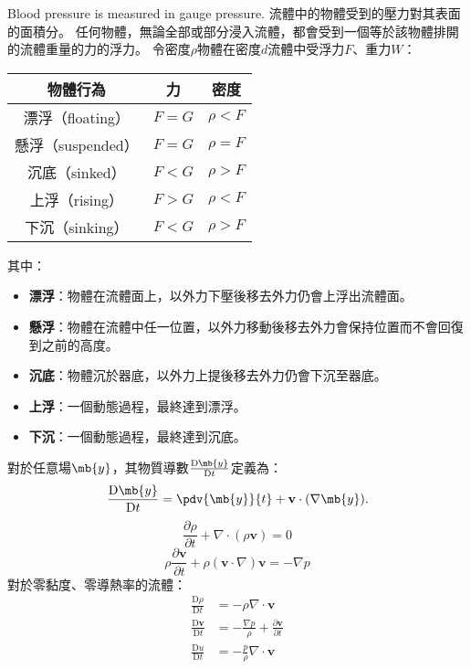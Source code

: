 \documentclass[a4paper,12pt]{article}
\begin{document}
Blood pressure is measured in gauge pressure.
流體中的物體受到的壓力對其表面的面積分。
任何物體，無論全部或部分浸入流體，都會受到一個等於該物體排開的流體重量的力的浮力。
令密度$\rho$物體在密度$d$流體中受浮力$F$、重力$W$：
\begin{longtable}[c]{|c|c|c|}
\hline
物體行為 & 力 & 密度 \\\hline\endhead
漂浮（floating） & $F=G$ & $\rho<F$ \\\hline
懸浮（suspended） & $F=G$ & $\rho=F$ \\\hline
沉底（sinked） & $F<G$ & $\rho>F$ \\\hline
上浮（rising） & $F>G$ & $\rho<F$ \\\hline
下沉（sinking） & $F<G$ & $\rho>F$ \\\hline
\end{longtable}\FB
其中：
\begin{itemize}
\item\textbf{漂浮}：物體在流體面上，以外力下壓後移去外力仍會上浮出流體面。
\item\textbf{懸浮}：物體在流體中任一位置，以外力移動後移去外力會保持位置而不會回復到之前的高度。
\item\textbf{沉底}：物體沉於器底，以外力上提後移去外力仍會下沉至器底。
\item\textbf{上浮}：一個動態過程，最終達到漂浮。
\item\textbf{下沉}：一個動態過程，最終達到沉底。
\end{itemize}
對於任意場$\mb{y}$，其物質導數$\frac{\mathrm{D}\mb{y}}{\mathrm{D}t}$定義為：
\[\frac{\mathrm{D}\mb{y}}{\mathrm{D}t}=\pdv{\mb{y}}{t}+\mathbf{v}\cdot(\nabla \mb{y}).\]
\[\frac{\partial\rho}{\partial t}+\nabla\cdot(\rho\mathbf{v})=0\]
\[\rho\frac{\partial\mathbf{v}}{\partial t}+\rho(\mathbf{v}\cdot\nabla)\mathbf{v}=-\nabla p\]
對於零黏度、零導熱率的流體：
\[\begin{aligned}
\frac{\mathrm{D}\rho}{\mathrm{D}t}&=-\rho\nabla\cdot\mathbf {v}\\
\frac{\mathrm{D}\mathbf{v}}{\mathrm{D}t}&=-\frac{\nabla p}{\rho}+\frac{\partial\mathbf{v}}{\partial t}\\
\frac{\mathrm{D}u}{\mathrm{D}t}&=-\frac{p}{\rho}\nabla\cdot\mathbf{v}
\end{aligned}\]
\end{document}
